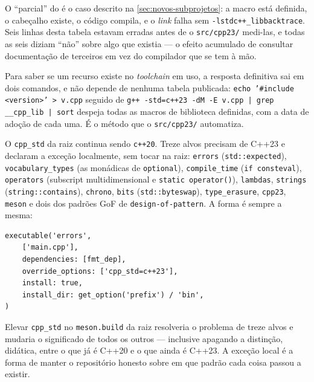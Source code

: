 O ``parcial'' do  é o caso descrito na
\cref{sec:novos-subprojetos}: a macro está definida, o cabeçalho existe, o
código compila, e o \emph{link} falha sem \texttt{-lstdc++\_libbacktrace}. Seis
linhas desta tabela estavam erradas antes de o \texttt{src/cpp23/} medi-las, e
todas as seis diziam ``não'' sobre algo que existia --- o efeito acumulado de
consultar documentação de terceiros em vez do compilador que se tem à mão.

\begin{regra}
Para saber se um recurso existe no \emph{toolchain} em uso, a resposta
definitiva sai em dois comandos, e não depende de nenhuma tabela publicada:
\texttt{echo '\#include <version>' > v.cpp} seguido de
\texttt{g++ -std=c++23 -dM -E v.cpp | grep \_\_cpp\_lib | sort} despeja todas as
macros de biblioteca definidas, com a data de adoção de cada uma. É o método
que o \texttt{src/cpp23/} automatiza.
\end{regra}

O \texttt{cpp\_std} da raiz continua sendo \texttt{c++20}. Treze alvos precisam
de C++23 e declaram a exceção localmente, sem tocar na raiz: \texttt{errors}
(\texttt{std::expected}), \texttt{vocabulary\_types} (as monádicas de
\texttt{optional}), \texttt{compile\_time} (\texttt{if consteval}),
\texttt{operators} (subscript multidimensional e \texttt{static operator()}),
\texttt{lambdas}, \texttt{strings} (\texttt{string::contains}), \texttt{chrono},
\texttt{bits} (\texttt{std::byteswap}), \texttt{type\_erasure},
\texttt{cpp23}, \texttt{meson} e dois dos padrões GoF de
\texttt{design-of-pattern}. A forma é sempre a mesma:

\begin{lstlisting}[style=bt, language=Meson,
    caption={O padrão elevado só onde é preciso, em
             \texttt{src/errors/meson.build}.}]
executable('errors',
    ['main.cpp'],
    dependencies: [fmt_dep],
    override_options: ['cpp_std=c++23'],
    install: true,
    install_dir: get_option('prefix') / 'bin',
)
\end{lstlisting}

\begin{regra}
Elevar \texttt{cpp\_std} no \texttt{meson.build} da raiz resolveria o problema
de treze alvos e mudaria o significado de todos os outros --- inclusive
apagando a distinção, didática, entre o que já é C++20 e o que ainda é C++23.
A exceção local é a forma de manter o repositório honesto sobre em que padrão
cada coisa passou a existir.
\end{regra}

